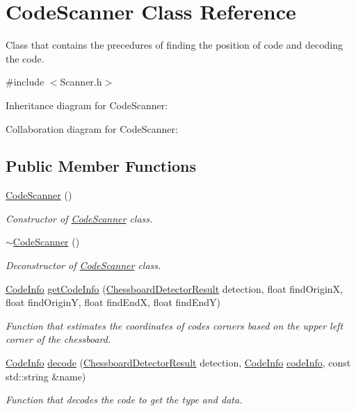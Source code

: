 \hypertarget{class_code_scanner}{}\section{Code\+Scanner Class Reference}
\label{class_code_scanner}


Class that contains the precedures of finding the position of code and decoding the code.  




{\ttfamily \#include $<$Scanner.\+h$>$}



Inheritance diagram for Code\+Scanner\+:


Collaboration diagram for Code\+Scanner\+:
\subsection*{Public Member Functions}
\begin{DoxyCompactItemize}
\item 
\hyperlink{class_code_scanner_a3bcd2d58ba99d3489a82c39a7982d13b}{Code\+Scanner} ()
\begin{DoxyCompactList}\small\item\em Constructor of \hyperlink{class_code_scanner}{Code\+Scanner} class. \end{DoxyCompactList}\item 
\hyperlink{class_code_scanner_a092360e7816a81de90384495bd0f3e44}{$\sim$\+Code\+Scanner} ()
\begin{DoxyCompactList}\small\item\em Deconstructor of \hyperlink{class_code_scanner}{Code\+Scanner} class. \end{DoxyCompactList}\item 
\hyperlink{struct_code_info}{Code\+Info} \hyperlink{class_code_scanner_a8ed0db374175da430110411dac1ceba1}{get\+Code\+Info} (\hyperlink{struct_chessboard_detector_result}{Chessboard\+Detector\+Result} detection, float find\+OriginX, float find\+OriginY, float find\+EndX, float find\+EndY)
\begin{DoxyCompactList}\small\item\em Function that estimates the coordinates of code\textquotesingle{}s corners based on the upper left corner of the chessboard. \end{DoxyCompactList}\item 
\hyperlink{struct_code_info}{Code\+Info} \hyperlink{class_code_scanner_a9660d74f2750b274d92396be1cd63ab4}{decode} (\hyperlink{struct_chessboard_detector_result}{Chessboard\+Detector\+Result} detection, \hyperlink{struct_code_info}{Code\+Info} \hyperlink{class_code_scanner_a7f6371a29a0d630c9508c070f8c8966f}{code\+Info}, const std\+::string \&name)
\begin{DoxyCompactList}\small\item\em Function that decodes the code to get the type and data. \end{DoxyCompactList}\end{DoxyCompactItemize}
